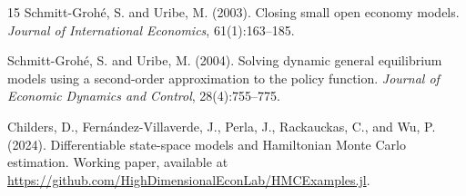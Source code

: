 \documentclass[11pt,a4paper]{article}
\theoremstyle{definition}
\begin{document}
\begin{thebibliography}{15}
		Schmitt-Groh{\'e}, S. and Uribe, M. (2003).
		Closing small open economy models.
		\emph{Journal of International Economics}, 61(1):163--185.

		Schmitt-Groh{\'e}, S. and Uribe, M. (2004).
		Solving dynamic general equilibrium models using a second-order approximation to the policy function.
		\emph{Journal of Economic Dynamics and Control}, 28(4):755--775.

		Childers, D., Fern{\'a}ndez-Villaverde, J., Perla, J., Rackauckas, C., and Wu, P. (2024).
		Differentiable state-space models and Hamiltonian Monte Carlo estimation.
		Working paper, available at \url{https://github.com/HighDimensionalEconLab/HMCExamples.jl}.
		
	\end{thebibliography}
	
\end{document}
